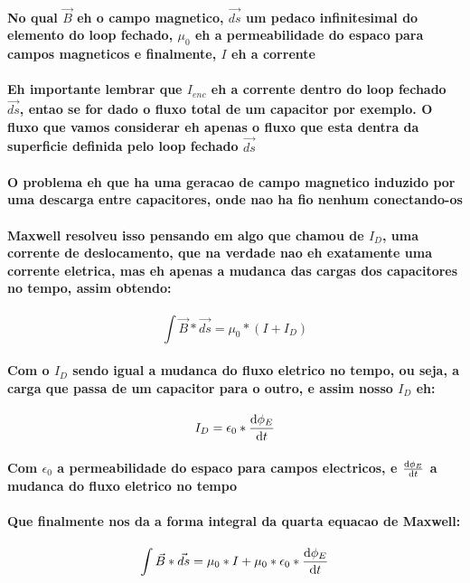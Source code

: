 \documentclass[12pt,twoside, a4paper, twocolumn]{article}
\begin{document}
\paragraph*{No qual $\vec{B}$ eh o campo magnetico, $\vec{ds}$ um pedaco infinitesimal do elemento do loop fechado, $\mu_0$ eh a permeabilidade do espaco para campos magneticos e finalmente, $I$ eh a corrente}
\paragraph*{Eh importante lembrar que $I_{enc}$ eh a corrente dentro do loop fechado $\vec{ds}$, entao se for dado o fluxo total de um capacitor por exemplo. O fluxo que vamos considerar eh apenas o fluxo que esta dentra da superficie definida pelo loop fechado $\vec{ds}$}
\paragraph*{O problema eh que ha uma geracao de campo magnetico induzido por uma descarga entre capacitores, onde nao ha fio nenhum conectando-os}
\paragraph*{Maxwell resolveu isso pensando em algo que chamou de $I_D$, uma corrente de deslocamento, que na verdade nao eh exatamente uma corrente eletrica, mas eh apenas a mudanca das cargas dos capacitores no tempo, assim obtendo:}
\begin{equation}
    \int \vec{B} * \vec{ds} = \mu_0 * \left(I +I_D\right)
\end{equation}
\paragraph*{Com o $I_D$ sendo igual a mudanca do fluxo eletrico no tempo, ou seja, a carga que passa de um capacitor para o outro, e assim nosso $I_D$ eh:}
\begin{equation}
    I_D = \epsilon_0 * \frac{\mathrm d \phi_E}{\mathrm d t}
\end{equation}
\paragraph*{Com $\epsilon_0$ a permeabilidade do espaco para campos electricos, e $\frac{\mathrm d \phi_E}{\mathrm d t}$ a mudanca do fluxo eletrico no tempo}
\paragraph*{Que finalmente nos da a forma integral da quarta equacao de Maxwell:}
\begin{equation}
    \int \vec{B} * \vec{ds} = \mu_0 * I + \mu_0 * \epsilon_0 * \frac{\mathrm d \phi_E}{\mathrm d t}
\end{equation}
\end{document}
